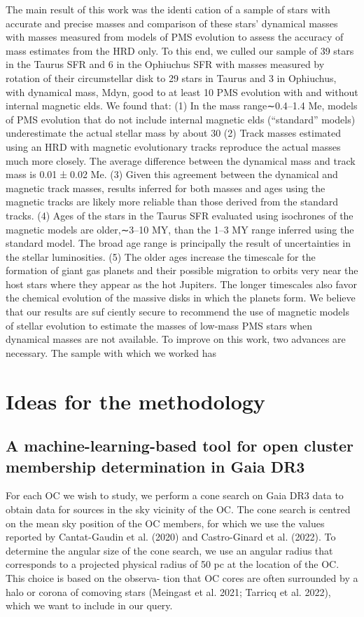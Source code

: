 \documentclass[../main.tex]{subfiles}
\begin{document}
{The main result of this work was the identi cation of a sample
of stars with accurate and precise masses and comparison of
these stars’ dynamical masses with masses measured from
models of PMS evolution to assess the accuracy of mass
estimates from the HRD only. To this end, we culled our sample
of 39 stars in the Taurus SFR and 6 in the Ophiuchus SFR with
masses measured by rotation of their circumstellar disk to 29
stars in Taurus and 3 in Ophiuchus, with dynamical mass, Mdyn,
good to at least 10%
PMS evolution with and without internal magnetic elds.
We found that:
(1) In the mass range∼0.4–1.4 Me, models of PMS evolution
that do not include internal magnetic elds (“standard”
models) underestimate the actual stellar mass by about 30%
(2) Track masses estimated using an HRD with magnetic
evolutionary tracks reproduce the actual masses much
more closely. The average difference between the
dynamical mass and track mass is 0.01±0.02 Me.
(3) Given this agreement between the dynamical and
magnetic track masses, results inferred for both masses
and ages using the magnetic tracks are likely more
reliable than those derived from the standard tracks.
(4) Ages of the stars in the Taurus SFR evaluated using
isochrones of the magnetic models are older,∼3–10 MY,
than the 1–3 MY range inferred using the standard model.
The broad age range is principally the result of
uncertainties in the stellar luminosities.
(5) The older ages increase the timescale for the formation of
giant gas planets and their possible migration to orbits
very near the host stars where they appear as the hot
Jupiters. The longer timescales also favor the chemical
evolution of the massive disks in which the planets form.
We believe that our results are suf ciently secure to
recommend the use of magnetic models of stellar evolution
to estimate the masses of low-mass PMS stars when dynamical
masses are not available. To improve on this work, two
advances are necessary. The sample with which we worked has

\section{Ideas for the methodology}
\subsection{A machine-learning-based tool for open cluster membership determination in Gaia DR3} %
For each OC we wish to study, we perform a cone search on Gaia DR3 data to obtain data for sources in the sky vicinity of the OC. The cone search is centred on the mean sky position of the OC members, for which we use the values reported by Cantat-Gaudin et al. (2020) and Castro-Ginard et al. (2022). To determine the angular size of the cone search, we use an angular radius that corresponds to a projected physical radius of 50 pc at the location of the OC. This choice is based on the observa- tion that OC cores are often surrounded by a halo or corona of comoving stars (Meingast et al. 2021; Tarricq et al. 2022), which we want to include in our query.

}
\end{document}
